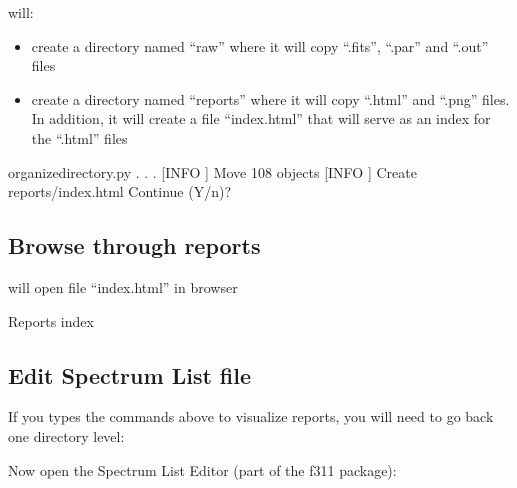 \documentclass[letterpaper,10pt,english]{sphinxmanual}
\begin{document}
 will:
\begin{itemize}
\item {} 
create a directory named “raw” where it will copy “.fits”, “.par” and “.out” files

\item {} 
create a directory named “reports” where it will copy “.html” and “.png” files. In addition, it will
create a file “index.html” that will serve as an index for the “.html” files

\end{itemize}

\begin{sphinxVerbatim}[commandchars=\\\{\}]
organize\PYGZhy{}directory.py
.
.
.
[INFO    ]   \PYGZhy{} Move 108 objects
[INFO    ]   \PYGZhy{} Create \PYGZsq{}reports/index.html\PYGZsq{}
Continue (Y/n)?
\end{sphinxVerbatim}


\subsection{Browse through reports}
\label{\detokenize{aosss:browse-through-reports}}
\begin{sphinxVerbatim}[commandchars=\\\{\}]
 
 
\end{sphinxVerbatim}

will open file “index.html” in browser


 \textendash{} Reports index


\subsection{Edit Spectrum List file}
\label{\detokenize{aosss:edit-spectrum-list-file}}
If you types the commands above to visualize reports, you will need to go back one directory level:

\begin{sphinxVerbatim}[commandchars=\\\{\}]
 
\end{sphinxVerbatim}

Now open the Spectrum List Editor (part of the f311 package):
\end{document}
